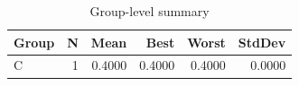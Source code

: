 \begin{table}[htbp]
\centering
\caption{Group-level summary}
\label{tab:group-summary}
\begin{tabular}{lrrrrr}
\toprule
\textbf{Group} & \textbf{N} & \textbf{Mean} & \textbf{Best} & \textbf{Worst} & \textbf{StdDev} \\
\midrule
C & 1 & 0.4000 & 0.4000 & 0.4000 & 0.0000 \\
\bottomrule
\end{tabular}
\end{table}
